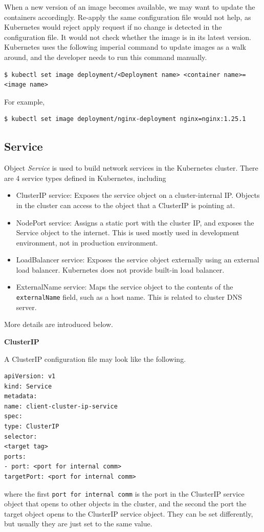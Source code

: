 When a new version of an image becomes available, we may want to update the containers accordingly. Re-apply the same configuration file would not help, as Kubernetes would reject apply request if no change is detected in the configuration file. It would not check whether the image is in its latest version. Kubernetes uses the following imperial command to update images as a walk around, and the developer needs to run this command manually.
\begin{lstlisting}
$ kubectl set image deployment/<Deployment name> <container name>=<image name>
\end{lstlisting}
For example,
\begin{lstlisting}
$ kubectl set image deployment/nginx-deployment nginx=nginx:1.25.1
\end{lstlisting}

\subsection{Service} \label{ch:vac:subsec:k8snetworking}

Object \textit{Service} is used to build network services in the Kubernetes cluster. There are 4 service types defined in Kubernetes, including
\begin{itemize}
	\item ClusterIP service: Exposes the service object on a cluster-internal IP. Objects in the cluster can access to the object that a ClusterIP is pointing at.
	\item NodePort service: Assigns a static port with the cluster IP, and exposes the Service object to the internet. This is used mostly used in development environment, not in production environment.
	\item LoadBalancer service: Exposes the service object externally using an external load balancer. Kubernetes does not provide built-in load balancer.
	\item ExternalName service: Maps the service object to the contents of the \verb|externalName| field, such as a host name. This is related to cluster DNS server.
\end{itemize}

More details are introduced below.

\vspace{0.1in}
\noindent \textbf{ClusterIP}
\vspace{0.1in}

A ClusterIP configuration file may look like the following.
\begin{lstlisting}
apiVersion: v1
kind: Service
metadata:
name: client-cluster-ip-service
spec:
type: ClusterIP
selector:
<target tag>
ports:
- port: <port for internal comm>
targetPort: <port for internal comm>
\end{lstlisting}
where the first \verb|port for internal comm| is the port in the ClusterIP service object that opens to other objects in the cluster, and the second the port the target object opens to the ClusterIP service object. They can be set differently, but usually they are just set to the same value.

